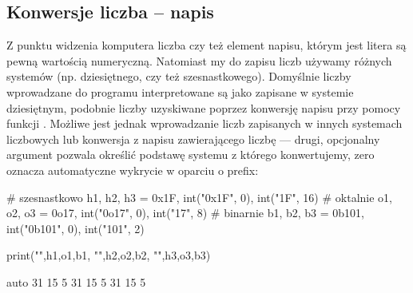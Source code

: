 \documentclass{pdfBooklets}
\begin{document}

\subsection{Konwersje liczba -- napis}

Z punktu widzenia komputera liczba czy też element napisu, którym jest litera są pewną wartością numeryczną.
Natomiast my do zapisu liczb używamy różnych systemów (np. dziesiętnego, czy też szesnastkowego).
Domyślnie liczby wprowadzane do programu interpretowane są jako zapisane w systemie dziesiętnym,
podobnie liczby uzyskiwane poprzez konwersję napisu przy pomocy funkcji .
Możliwe jest jednak wprowadzanie liczb zapisanych w innych systemach liczbowych lub konwersja z napisu zawierającego liczbę ---
drugi, opcjonalny argument  pozwala określić podstawę systemu z którego konwertujemy, zero oznacza automatyczne wykrycie w oparciu o prefix:

\begin{CodeFrame}[python]{0.7\textwidth}
# szesnastkowo
h1, h2, h3 = 0x1F, int("0x1F", 0), int("1F", 16)
# oktalnie
o1, o2, o3 = 0o17, int("0o17", 0), int("17", 8)
# binarnie
b1, b2, b3 = 0b101, int("0b101", 0), int("101", 2)

print("",h1,o1,b1, "\n",h2,o2,b2, "\n",h3,o3,b3)
\end{CodeFrame}
\begin{CodeFrame}{auto}
 31 15 5
 31 15 5
 31 15 5
\end{CodeFrame}
\end{document}
